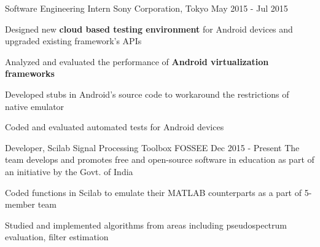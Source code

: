 \begin{cventries}
%
%
\cventry
{Software Engineering Intern} %
{Sony Corporation, Tokyo} %
{May 2015 - Jul 2015} %
{ %
\begin{cvitems}
    \item {Designed new \textbf{cloud based testing environment} for Android devices and upgraded existing framework's APIs}
    \item {Analyzed and evaluated the performance of \textbf{Android virtualization frameworks}} 
    \item {Developed stubs in Android's source code to workaround the restrictions of native emulator}
    \item {Coded and evaluated automated tests for Android devices}
\end{cvitems}
}
\cventrylong
{Developer, Scilab Signal Processing Toolbox} %
{FOSSEE} %
{Dec 2015 - Present} %
{The team develops and promotes free and open-source software in education as part of an initiative by the Govt. of India}
{ %
    \begin{cvitems}
        \item {Coded functions in Scilab to emulate their MATLAB counterparts as a part of 5-member team}
        \item {Studied and implemented algorithms from areas including pseudospectrum evaluation, filter estimation}
    \end{cvitems}
}
\end{cventries}